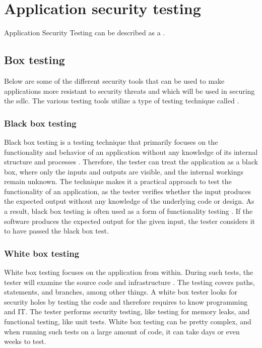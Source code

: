 \section{Application security testing}
Application Security Testing can be described as a \textit{} \cite{AST}.

\subsection{Box testing}
\label{boxtesting}
Below are some of the different security tools that can be used to make applications more resistant to security threats and which will be used in securing the \acrshort{sdlc}. 
The various testing tools utilize a type of testing technique called .

\subsubsection{Black box testing}
\label{BlackBoxTesting}
Black box testing is a testing technique that primarily focuses on the functionality and behavior of an application without any knowledge of its internal structure and processes  \cite{blackbox}. Therefore, the tester can treat the application as a black box, where only the inputs and outputs are visible, and the internal workings remain unknown. The technique makes it a practical approach to test the functionality of an application, as the tester verifies whether the input produces the expected output without any knowledge of the underlying code or design. As a result, black box testing is often used as a form of functionality testing \cite{BlackBoxTestingFunctional}. If the software produces the expected output for the given input, the tester considers it to have passed the black box test.

\subsubsection{White box testing}
White box testing focuses on the application from within. During such tests, the tester will examine the source code and infrastructure \cite{whitebox}. The testing covers paths, statements, and branches, among other things. A white box tester looks for security holes by testing the code and therefore requires to know programming and IT. The tester performs security testing, like testing for memory leaks, and functional testing, like unit tests. White box testing can be pretty complex, and when running such tests on a large amount of code, it can take days or even weeks to test. 


